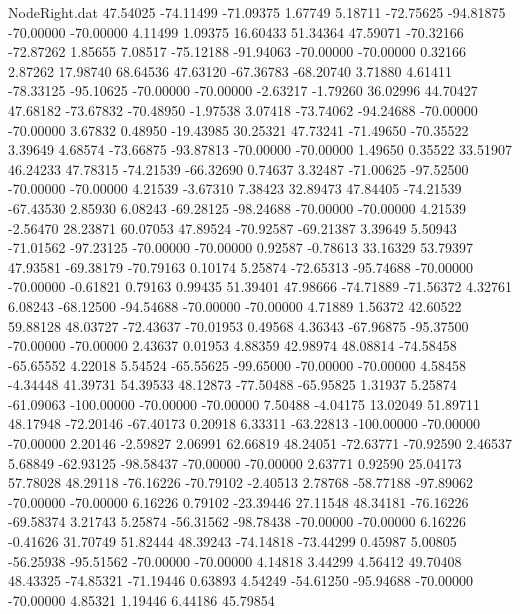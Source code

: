 \begin{filecontents}{NodeRight.dat}
  47.54025  -74.11499  -71.09375     1.67749    5.18711  -72.75625  -94.81875  -70.00000  -70.00000    4.11499    1.09375   16.60433   51.34364
  47.59071  -70.32166  -72.87262     1.85655    7.08517  -75.12188  -91.94063  -70.00000  -70.00000    0.32166    2.87262   17.98740   68.64536
  47.63120  -67.36783  -68.20740     3.71880    4.61411  -78.33125  -95.10625  -70.00000  -70.00000   -2.63217   -1.79260   36.02996   44.70427
  47.68182  -73.67832  -70.48950    -1.97538    3.07418  -73.74062  -94.24688  -70.00000  -70.00000    3.67832    0.48950  -19.43985   30.25321
  47.73241  -71.49650  -70.35522     3.39649    4.68574  -73.66875  -93.87813  -70.00000  -70.00000    1.49650    0.35522   33.51907   46.24233
  47.78315  -74.21539  -66.32690     0.74637    3.32487  -71.00625  -97.52500  -70.00000  -70.00000    4.21539   -3.67310    7.38423   32.89473
  47.84405  -74.21539  -67.43530     2.85930    6.08243  -69.28125  -98.24688  -70.00000  -70.00000    4.21539   -2.56470   28.23871   60.07053
  47.89524  -70.92587  -69.21387     3.39649    5.50943  -71.01562  -97.23125  -70.00000  -70.00000    0.92587   -0.78613   33.16329   53.79397
  47.93581  -69.38179  -70.79163     0.10174    5.25874  -72.65313  -95.74688  -70.00000  -70.00000   -0.61821    0.79163    0.99435   51.39401
  47.98666  -74.71889  -71.56372     4.32761    6.08243  -68.12500  -94.54688  -70.00000  -70.00000    4.71889    1.56372   42.60522   59.88128
  48.03727  -72.43637  -70.01953     0.49568    4.36343  -67.96875  -95.37500  -70.00000  -70.00000    2.43637    0.01953    4.88359   42.98974
  48.08814  -74.58458  -65.65552     4.22018    5.54524  -65.55625  -99.65000  -70.00000  -70.00000    4.58458   -4.34448   41.39731   54.39533
  48.12873  -77.50488  -65.95825     1.31937    5.25874  -61.09063 -100.00000  -70.00000  -70.00000    7.50488   -4.04175   13.02049   51.89711
  48.17948  -72.20146  -67.40173     0.20918    6.33311  -63.22813 -100.00000  -70.00000  -70.00000    2.20146   -2.59827    2.06991   62.66819
  48.24051  -72.63771  -70.92590     2.46537    5.68849  -62.93125  -98.58437  -70.00000  -70.00000    2.63771    0.92590   25.04173   57.78028
  48.29118  -76.16226  -70.79102    -2.40513    2.78768  -58.77188  -97.89062  -70.00000  -70.00000    6.16226    0.79102  -23.39446   27.11548
  48.34181  -76.16226  -69.58374     3.21743    5.25874  -56.31562  -98.78438  -70.00000  -70.00000    6.16226   -0.41626   31.70749   51.82444
  48.39243  -74.14818  -73.44299     0.45987    5.00805  -56.25938  -95.51562  -70.00000  -70.00000    4.14818    3.44299    4.56412   49.70408
  48.43325  -74.85321  -71.19446     0.63893    4.54249  -54.61250  -95.94688  -70.00000  -70.00000    4.85321    1.19446    6.44186   45.79854

\end{filecontents}
